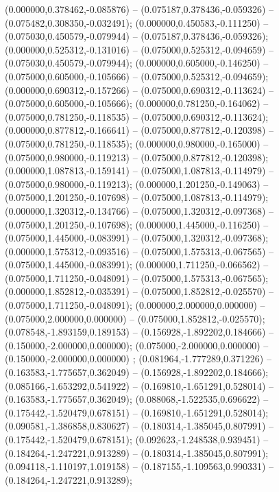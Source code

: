  (0.000000,0.378462,-0.085876) -- (0.075187,0.378436,-0.059326) -- (0.075482,0.308350,-0.032491);
 (0.000000,0.450583,-0.111250) -- (0.075030,0.450579,-0.079944) -- (0.075187,0.378436,-0.059326);
 (0.000000,0.525312,-0.131016) -- (0.075000,0.525312,-0.094659) -- (0.075030,0.450579,-0.079944);
 (0.000000,0.605000,-0.146250) -- (0.075000,0.605000,-0.105666) -- (0.075000,0.525312,-0.094659);
 (0.000000,0.690312,-0.157266) -- (0.075000,0.690312,-0.113624) -- (0.075000,0.605000,-0.105666);
 (0.000000,0.781250,-0.164062) -- (0.075000,0.781250,-0.118535) -- (0.075000,0.690312,-0.113624);
 (0.000000,0.877812,-0.166641) -- (0.075000,0.877812,-0.120398) -- (0.075000,0.781250,-0.118535);
 (0.000000,0.980000,-0.165000) -- (0.075000,0.980000,-0.119213) -- (0.075000,0.877812,-0.120398);
 (0.000000,1.087813,-0.159141) -- (0.075000,1.087813,-0.114979) -- (0.075000,0.980000,-0.119213);
 (0.000000,1.201250,-0.149063) -- (0.075000,1.201250,-0.107698) -- (0.075000,1.087813,-0.114979);
 (0.000000,1.320312,-0.134766) -- (0.075000,1.320312,-0.097368) -- (0.075000,1.201250,-0.107698);
 (0.000000,1.445000,-0.116250) -- (0.075000,1.445000,-0.083991) -- (0.075000,1.320312,-0.097368);
 (0.000000,1.575312,-0.093516) -- (0.075000,1.575313,-0.067565) -- (0.075000,1.445000,-0.083991);
 (0.000000,1.711250,-0.066562) -- (0.075000,1.711250,-0.048091) -- (0.075000,1.575313,-0.067565);
 (0.000000,1.852812,-0.035391) -- (0.075000,1.852812,-0.025570) -- (0.075000,1.711250,-0.048091);
 (0.000000,2.000000,0.000000) -- (0.075000,2.000000,0.000000) -- (0.075000,1.852812,-0.025570);
 (0.078548,-1.893159,0.189153) -- (0.156928,-1.892202,0.184666) -- (0.150000,-2.000000,0.000000);
 (0.075000,-2.000000,0.000000) -- (0.150000,-2.000000,0.000000) ;
 (0.081964,-1.777289,0.371226) -- (0.163583,-1.775657,0.362049) -- (0.156928,-1.892202,0.184666);
 (0.085166,-1.653292,0.541922) -- (0.169810,-1.651291,0.528014) -- (0.163583,-1.775657,0.362049);
 (0.088068,-1.522535,0.696622) -- (0.175442,-1.520479,0.678151) -- (0.169810,-1.651291,0.528014);
 (0.090581,-1.386858,0.830627) -- (0.180314,-1.385045,0.807991) -- (0.175442,-1.520479,0.678151);
 (0.092623,-1.248538,0.939451) -- (0.184264,-1.247221,0.913289) -- (0.180314,-1.385045,0.807991);
 (0.094118,-1.110197,1.019158) -- (0.187155,-1.109563,0.990331) -- (0.184264,-1.247221,0.913289);
